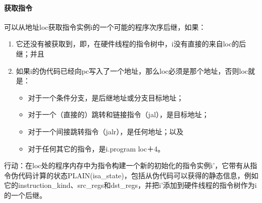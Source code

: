 \paragraph{获取指令}\label{omm:fetch}
可以从地址loc获取指令实例i的一个可能的程序次序后继，如果：
\begin{enumerate}
\item 它还没有被获取到，即，在硬件线程的指令树中，i没有直接的来自loc的后继；并且 %
\item 如果i的伪代码已经向pc写入了一个地址，那么loc必须是那个地址，否则loc就是：  %
  \begin{itemize}
  \item 对于一个条件分支，是后继地址或分支目标地址；  %
  \item 对于一个（直接的）跳转和链接指令（jal），是目标地址；  %
  \item 对于一个间接跳转指令（jalr），是任何地址；以及  %
  \item 对于任何其它的指令，是i.program loc＋4。 %
  \end{itemize}
\end{enumerate}

行动：在loc处的程序内存中为指令构建一个新的初始化的指令实例i’，它带有从指令伪代码计算的状态PLAIN(isa_state)，包括从伪代码可以获得的静态信息，例如它的instruction_kind、src_regs和dst_regs，并把i’添加到硬件线程的指令树作为i的一个后继。


